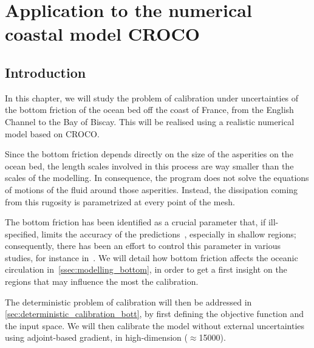 \documentclass[../../Main_ManuscritThese.tex]{subfiles}
\newcommand{\CROCO}{CROCO}
\begin{document}
\chapter{Application to the numerical coastal model \CROCO}
\label{chap:croco}
\minitoc
\newpage
\subfileLocal{\pagestyle{contentStyle}}

\section{Introduction}
\label{sec:intro_croco}

In this chapter, we will study the problem of calibration under
uncertainties of the bottom friction of the ocean bed off the coast of
France, from the English Channel to the Bay of Biscay. This will be
realised using a realistic numerical model based on CROCO.

Since the bottom friction depends directly on the size of the
asperities on the ocean bed, the length scales involved in this
process are way smaller than the scales of the modelling. In
consequence, the program does not solve the equations of motions of
the fluid around those asperities. Instead, the dissipation coming
from this rugosity is parametrized at every point of the mesh.

The bottom friction has been identified as a crucial parameter that,
if ill-specified, limits the accuracy of the
predictions~\citep{sinha_principal_1997,kreitmair_effect_2019},
especially in shallow regions; consequently, there has been an
effort to control this parameter in various
studies, for instance in~\cite{das_variational_1992,das_estimation_1991,boutet_estimation_2015}.
We will detail how bottom friction affects the oceanic circulation
in~\cref{ssec:modelling_bottom}, in order to get a first insight on
the regions that may influence the most the calibration.

The deterministic problem of calibration will then be addressed in
\cref{sec:deterministic_calibration_bott}, by first defining the objective
function and the input space. We will then calibrate the model without
external uncertainties using adjoint-based gradient, in high-dimension
($\approx$\num{15000}).
\end{document}
